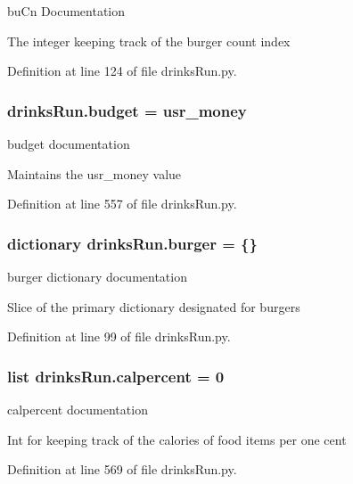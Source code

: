 bu\-Cn Documentation 

The integer keeping track of the burger count index 

Definition at line 124 of file drinks\-Run.\-py.

\hypertarget{namespacedrinksRun_abbe965c631ba5fc34a4aa84677d14057}{
\subsubsection[{budget}]{\setlength{\rightskip}{0pt plus 5cm}drinks\-Run.\-budget = {\bf usr\-\_\-money}}}\label{namespacedrinksRun_abbe965c631ba5fc34a4aa84677d14057}


budget documentation 

Maintains the usr\-\_\-money value 

Definition at line 557 of file drinks\-Run.\-py.

\hypertarget{namespacedrinksRun_a1f8969b1be20225df0aaae47798fc30b}{
\subsubsection[{burger}]{\setlength{\rightskip}{0pt plus 5cm}dictionary drinks\-Run.\-burger = \{\}}}\label{namespacedrinksRun_a1f8969b1be20225df0aaae47798fc30b}


burger dictionary documentation 

Slice of the primary dictionary designated for burgers 

Definition at line 99 of file drinks\-Run.\-py.

\hypertarget{namespacedrinksRun_a085059cd3f6a34b74289cf85fe19dad5}{
\subsubsection[{calpercent}]{\setlength{\rightskip}{0pt plus 5cm}list drinks\-Run.\-calpercent = 0}}\label{namespacedrinksRun_a085059cd3f6a34b74289cf85fe19dad5}


calpercent documentation 

Int for keeping track of the calories of food items per one cent 

Definition at line 569 of file drinks\-Run.\-py.

